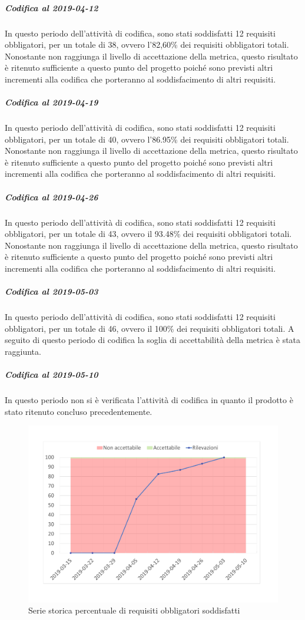 \subparagraph{Codifica al 2019-04-12}
In questo periodo dell'attività di codifica, sono stati soddisfatti 12 requisiti obbligatori, per un totale di 38, ovvero l'82,60\% dei requisiti obbligatori totali.
Nonostante non raggiunga il livello di accettazione della
metrica, questo risultato è ritenuto sufficiente a questo punto del progetto poiché sono previsti altri incrementi alla codifica che porteranno al soddisfacimento di altri requisiti.

\subparagraph{Codifica al 2019-04-19}
In questo periodo dell'attività di codifica, sono stati soddisfatti 12 requisiti obbligatori, per un totale di 40, ovvero l'86.95\% dei requisiti obbligatori totali.
Nonostante non raggiunga il livello di accettazione della
metrica, questo risultato è ritenuto sufficiente a questo punto del progetto poiché sono previsti altri incrementi alla codifica che porteranno al soddisfacimento di altri requisiti.

\subparagraph{Codifica al 2019-04-26}
In questo periodo dell'attività di codifica, sono stati soddisfatti 12 requisiti obbligatori, per un totale di 43, ovvero il 93.48\% dei requisiti obbligatori totali.
Nonostante non raggiunga il livello di accettazione della
metrica, questo risultato è ritenuto sufficiente a questo punto del progetto poiché sono previsti altri incrementi alla codifica che porteranno al soddisfacimento di altri requisiti.

\subparagraph{Codifica al 2019-05-03}
In questo periodo dell'attività di codifica, sono stati soddisfatti 12 requisiti obbligatori, per un totale di 46, ovvero il 100\% dei requisiti obbligatori totali.
A seguito di questo periodo di codifica la soglia di accettabilità della metrica è stata raggiunta.

\subparagraph{Codifica al 2019-05-10}
In questo periodo non si è verificata l'attività di codifica in quanto il prodotto è stato ritenuto concluso precedentemente.

\begin{figure}[H]
	\centering
	\includegraphics[scale=0.6]{images/resoconto/MPS6Chart.pdf}
	\caption{Serie storica percentuale di requisiti obbligatori soddisfatti}	
\end{figure}

